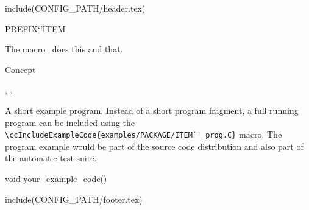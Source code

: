 include(CONFIG_PATH/header.tex)
\begin{ccRefMacro}{PREFIX`'ITEM}  %


\ccDefinition
  
The macro \ccRefName\ does this and that.



\ccIsModel

Concept

\ccSeeAlso

,
.

\ccExample

A short example program.
Instead of a short program fragment, a full running program can be
included using the 
\verb|\ccIncludeExampleCode{examples/PACKAGE/ITEM`'_prog.C}| 
macro. The program example would be part of the source code distribution and
also part of the automatic test suite.

\begin{ccExampleCode}
void your_example_code() {
}
\end{ccExampleCode}


\end{ccRefMacro}

include(CONFIG_PATH/footer.tex)
